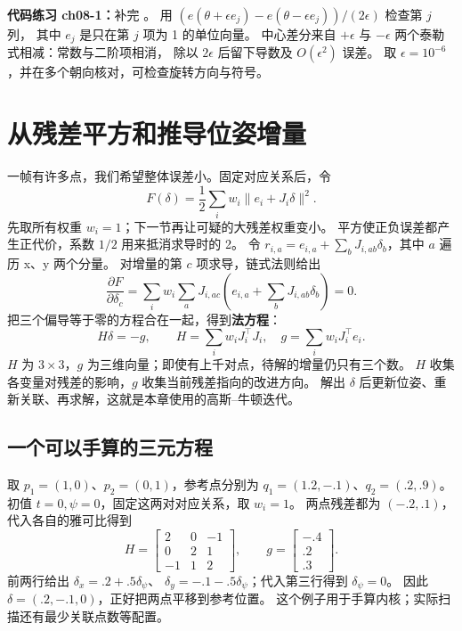 \textbf{代码练习 ch08-1：}补完 。
用 $(e(\theta+\epsilon e_j)-e(\theta-\epsilon e_j))/(2\epsilon)$ 检查第 $j$ 列，
其中 $e_j$ 是只在第 $j$ 项为 1 的单位向量。
中心差分来自 $+\epsilon$ 与 $-\epsilon$ 两个泰勒式相减：常数与二阶项相消，
除以 $2\epsilon$ 后留下导数及 $O(\epsilon^2)$ 误差。
取 $\epsilon=10^{-6}$，并在多个朝向核对，可检查旋转方向与符号。

\section{从残差平方和推导位姿增量}
一帧有许多点，我们希望整体误差小。固定对应关系后，令
\begin{equation}
F(\delta)=\frac12\sum_iw_i\|e_i+J_i\delta\|^2.
\end{equation}
先取所有权重 $w_i=1$；下一节再让可疑的大残差权重变小。
平方使正负误差都产生正代价，系数 $1/2$ 用来抵消求导时的 2。
令 $r_{i,a}=e_{i,a}+\sum_bJ_{i,ab}\delta_b$，其中 $a$ 遍历 x、y 两个分量。
对增量的第 $c$ 项求导，链式法则给出
\begin{equation}
\frac{\partial F}{\partial\delta_c}
=\sum_iw_i\sum_aJ_{i,ac}
 \left(e_{i,a}+\sum_bJ_{i,ab}\delta_b\right)=0.
\end{equation}
把三个偏导等于零的方程合在一起，得到\textbf{法方程}：
\begin{equation}
H\delta=-g,\qquad
H=\sum_iw_iJ_i^\top J_i,\quad g=\sum_iw_iJ_i^\top e_i.
\end{equation}
$H$ 为 $3\times3$，$g$ 为三维向量；即使有上千对点，待解的增量仍只有三个数。
$H$ 收集各变量对残差的影响，$g$ 收集当前残差指向的改进方向。
解出 $\delta$ 后更新位姿、重新关联、再求解，这就是本章使用的高斯--牛顿迭代。

\subsection{一个可以手算的三元方程}
取 $p_1=(1,0)$、$p_2=(0,1)$，参考点分别为
$q_1=(1.2,-.1)$、$q_2=(.2,.9)$。初值 $t=0,\psi=0$，固定这两对对应关系，取 $w_i=1$。
两点残差都为 $(-.2,.1)$，代入各自的雅可比得到
\[
H=\begin{bmatrix}2&0&-1\\0&2&1\\-1&1&2\end{bmatrix},\qquad
 g=\begin{bmatrix}-.4\\.2\\.3\end{bmatrix}.
\]
前两行给出 $\delta_x=.2+.5\delta_\psi$、
$\delta_y=-.1-.5\delta_\psi$；代入第三行得到 $\delta_\psi=0$。
因此 $\delta=(.2,-.1,0)$，正好把两点平移到参考位置。
这个例子用于手算内核；实际扫描还有最少关联点数等配置。

